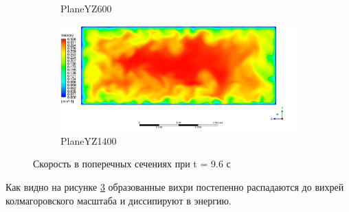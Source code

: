 \begin{figure}[H]
\begin{subfigure}{.5\textwidth}
			\caption{PlaneYZ600}
			\label{fig:T96VelocityContourYZ600}
		\end{subfigure}%
		\begin{subfigure}{.5\textwidth}
			\centering
			\includegraphics[width=1.1\linewidth]{../Assets/T96_Velocity_ContourYZ1400}
			\caption{PlaneYZ1400}
			\label{fig:T96VelocityContourYZ1400}
		\end{subfigure}
		\caption{Скорость в поперечных сечениях при t = 9.6 с}
		\label{fig:T96VelocityContourYZ}
	\end{figure}
	Как видно на рисунке \ref{fig:T96VelocityContourYZ} образованные вихри постепенно распадаются до вихрей колмагоровского масштаба и диссипируют в энергию. 
